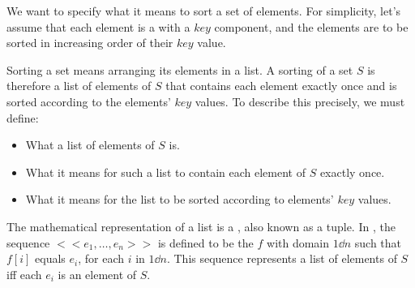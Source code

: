 \documentclass[fleqn,leqno]{article}
\begin{document}
We want to specify what it means to sort a set of elements.  For
simplicity, let's assume that each element is a 
  with a $key$
component, and the elements are to be sorted in increasing order of
their $key$ value.

Sorting a set means arranging its elements in a list.  A sorting of a
set $S$ is therefore a list of elements of $S$ that contains each
element exactly once and is sorted according to the elements'
$key$ values.  To describe this precisely, we must define:
\begin{itemize}
\item What a list of elements of $S$ is.
\item What it means for such a list to contain each element of $S$
exactly once.
\item What it means for the list to be sorted according to 
elements' $key$ values.
\end{itemize}
%
The mathematical representation of a list is a 
  , 
also known as a tuple.  In \tlaplus, the sequence 
  $<<e_{1}, \ldots, e_{n} >>$
is defined to be the  $f$ with domain
$1\dd n$ such that $f[i]$ equals $e_{i}$, for each $i$ in $1\dd n$.
This sequence represents a list of elements of $S$ iff each $e_{i}$ is
an element of $S$.  
\end{document}
